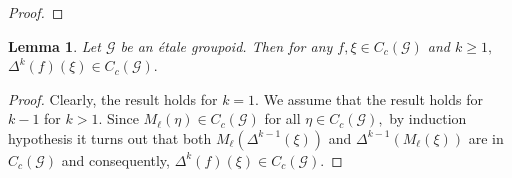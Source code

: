 \documentclass[a4paper,11pt,reqno]{amsart}
\theoremstyle{plain}
\newtheorem{lem}[thm]{Lemma}
\theoremstyle{named}
\numberwithin{equation}{section}
\newcommand{\Bea}{\begin{eqnarray*}}
\newcommand{\Eea}{\end{eqnarray*}}
\begin{document}
\begin{proof}
			\end{proof}
			
			
			
			\begin{lem}\label{lem2}
				Let $\mathcal G$ be an étale groupoid. Then for any $f, \xi \in C_c (\mathcal G)$ and $k \geq 1,$ $\Delta^k (f) (\xi) \in C_c (\mathcal G).$    
			\end{lem}
			
			\begin{proof}
				Clearly, the result holds for $k = 1.$ We assume that the result holds for $k - 1$ for $k > 1.$ Since $M_{\ell} (\eta) \in C_c (\mathcal G)$ for all $\eta \in C_c (\mathcal G),$ by induction hypothesis it turns out that both $M_{\ell} \left (\Delta^{k - 1} (\xi) \right )$ and $\Delta^{k - 1} \left (M_{\ell} (\xi) \right )$ are in $C_c (\mathcal G)$ and consequently, $\Delta^k (f) (\xi) \in C_c (\mathcal G).$
			\end{proof}
			
\end{document}
